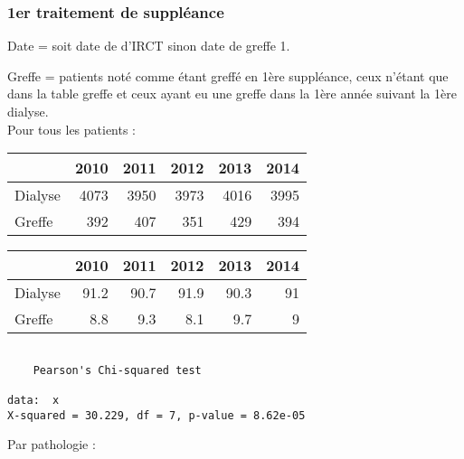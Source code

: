 \documentclass[11pt,a4paper]{article}\usepackage[]{graphicx}\usepackage[]{color}
\makeatletter
\newenvironment{kframe}{%
 \def\at@end@of@kframe{}%
 \ifinner\ifhmode%
  \def\at@end@of@kframe{\end{minipage}}%
  \begin{minipage}{\columnwidth}%
 \fi\fi%
 \def\FrameCommand##1{\hskip\@totalleftmargin \hskip-\fboxsep
 \colorbox{shadecolor}{##1}\hskip-\fboxsep
     \hskip-\linewidth \hskip-\@totalleftmargin \hskip\columnwidth}%
 \MakeFramed {\advance\hsize-\width
   \@totalleftmargin\z@ \linewidth\hsize
   \@setminipage}}%
 {\par\unskip\endMakeFramed%
 \at@end@of@kframe}
\newenvironment{knitrout}{}{} %
\makeatother
\begin{document}
    \subsubsection{1er traitement de suppléance}

Date = soit date de d'IRCT sinon date de greffe 1. 

Greffe = patients noté comme étant greffé en 1ère suppléance, ceux n'étant que dans la table greffe et ceux ayant eu une greffe dans la 1ère année suivant la 1ère dialyse.
~\\

Pour tous les patients :

\begin{table}[H]
\centering
\begin{tabular}{lrrrrr}
  \hline
 & 2010 & 2011 & 2012 & 2013 & 2014 \\ 
  \hline
Dialyse & 4073 & 3950 & 3973 & 4016 & 3995 \\ 
  Greffe & 392 & 407 & 351 & 429 & 394 \\ 
   \hline
\end{tabular}
\end{table}
\begin{table}[H]
\centering
\begin{tabular}{lrrrrr}
  \hline
 & 2010 & 2011 & 2012 & 2013 & 2014 \\ 
  \hline
Dialyse & 91.2 & 90.7 & 91.9 & 90.3 & 91 \\ 
  Greffe & 8.8 & 9.3 & 8.1 & 9.7 & 9 \\ 
   \hline
\end{tabular}
\end{table}


\begin{knitrout}
\color{fgcolor}\begin{kframe}
\begin{verbatim}

	Pearson's Chi-squared test

data:  x
X-squared = 30.229, df = 7, p-value = 8.62e-05
\end{verbatim}
\end{kframe}
\end{knitrout}


Par pathologie :
\end{document}
